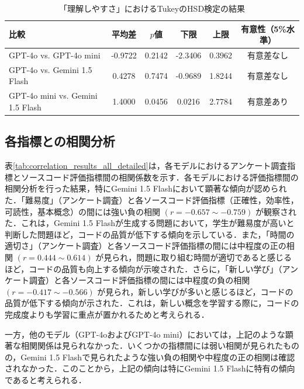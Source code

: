 \documentclass[11pt]{jreport}
\begin{document}
\begin{table}[h]
  \centering
  \caption{「理解しやすさ」におけるTukeyのHSD検定の結果}
  \label{tab:tukey_hsd_understanding}
  \begin{tabular}{lccccc}
    \hline
    比較 & 平均差 & $p$値 & 下限 & 上限 & 有意性（5\%水準） \\
    \hline
    GPT-4o vs. GPT-4o mini & -0.9722 & 0.2142 & -2.3406 & 0.3962 & 有意差なし \\
    GPT-4o vs. Gemini 1.5 Flash & 0.4278 & 0.7474 & -0.9689 & 1.8244 & 有意差なし \\
    GPT-4o mini vs. Gemini 1.5 Flash & 1.4000 & 0.0456 & 0.0216 & 2.7784 & 有意差あり \\
    \hline
  \end{tabular}
\end{table}

\subsection{各指標との相関分析}
表\ref{tab:correlation_results_all_detailed}は，各モデルにおけるアンケート調査指標とソースコード評価指標間の相関係数を示す．各モデルにおける評価指標間の相関分析を行った結果，特にGemini 1.5 Flashにおいて顕著な傾向が認められた．「難易度」（アンケート調査）と各ソースコード評価指標（正確性，効率性，可読性，基本概念）の間には強い負の相関 $(r=−0.657\sim−0.759)$ が観察された．これは，Gemini 1.5 Flashが生成する問題において，学生が難易度が高いと判断した問題ほど，コードの品質が低下する傾向を示している．また，「時間の適切さ」（アンケート調査）と各ソースコード評価指標の間には中程度の正の相関 $ (r=0.444\sim0.614) $ が見られ，問題に取り組む時間が適切であると感じるほど，コードの品質も向上する傾向が示唆された．さらに，「新しい学び」（アンケート調査）と各ソースコード評価指標の間には中程度の負の相関 $(r=−0.417\sim−0.566)$ が見られ，新しい学びが多いと感じるほど，コードの品質が低下する傾向が示された．これは，新しい概念を学習する際に，コードの完成度よりも学習に重点が置かれるためと考えられる．

一方，他のモデル（GPT-4oおよびGPT-4o mini）においては，上記のような顕著な相関関係は見られなかった．いくつかの指標間には弱い相関が見られたものの，Gemini 1.5 Flashで見られたような強い負の相関や中程度の正の相関は確認されなかった．このことから，上記の傾向は特にGemini 1.5 Flashに特有の傾向であると考えられる．
\end{document}
